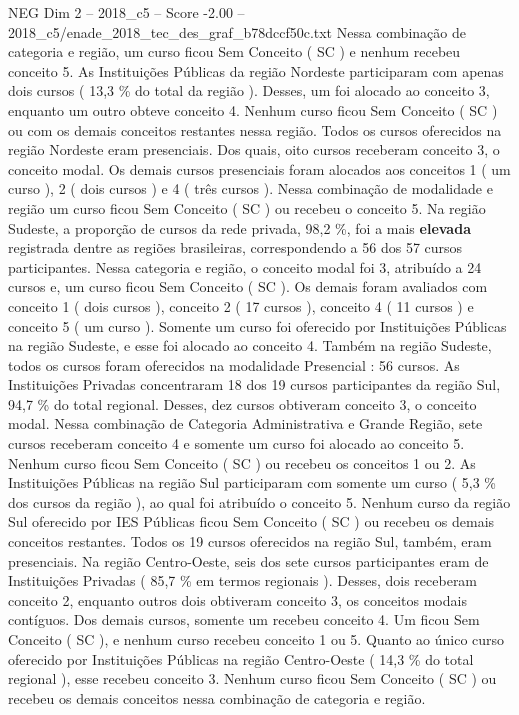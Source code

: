 \begin{textsample}{NEG Dim 2 – 2018\_c5 – Score -2.00 – 2018\_c5/enade\_2018\_tec\_des\_graf\_b78dccf50c.txt}
Nessa combinação de categoria e região, um curso ficou Sem Conceito ( SC ) e nenhum recebeu conceito 5.
As Instituições Públicas da região Nordeste participaram com apenas dois cursos ( 13,3 \% do total da região ).
Desses, um foi alocado ao conceito 3, enquanto um outro obteve conceito 4.
Nenhum curso ficou Sem Conceito ( SC ) ou com os demais conceitos restantes nessa região.
Todos os cursos oferecidos na região Nordeste eram presenciais.
Dos quais, oito cursos receberam conceito 3, o conceito modal.
Os demais cursos presenciais foram alocados aos conceitos 1 ( um curso ), 2 ( dois cursos ) e 4 ( três cursos ).
Nessa combinação de modalidade e região um curso ficou Sem Conceito ( SC ) ou recebeu o conceito 5.
Na região Sudeste, a proporção de cursos da rede privada, 98,2 \%, foi a mais \textbf{elevada} registrada dentre as regiões brasileiras, correspondendo a 56 dos 57 cursos participantes.
Nessa categoria e região, o conceito modal foi 3, atribuído a 24 cursos e, um curso ficou Sem Conceito ( SC ).
Os demais foram avaliados com conceito 1 ( dois cursos ), conceito 2 ( 17 cursos ), conceito 4 ( 11 cursos ) e conceito 5 ( um curso ).
Somente um curso foi oferecido por Instituições Públicas na região Sudeste, e esse foi alocado ao conceito 4.
Também na região Sudeste, todos os cursos foram oferecidos na modalidade Presencial : 56 cursos.
As Instituições Privadas concentraram 18 dos 19 cursos participantes da região Sul, 94,7 \% do total regional.
Desses, dez cursos obtiveram conceito 3, o conceito modal.
Nessa combinação de Categoria Administrativa e Grande Região, sete cursos receberam conceito 4 e somente um curso foi alocado ao conceito 5.
Nenhum curso ficou Sem Conceito ( SC ) ou recebeu os conceitos 1 ou 2.
As Instituições Públicas na região Sul participaram com somente um curso ( 5,3 \% dos cursos da região ), ao qual foi atribuído o conceito 5.
Nenhum curso da região Sul oferecido por IES Públicas ficou Sem Conceito ( SC ) ou recebeu os demais conceitos restantes.
Todos os 19 cursos oferecidos na região Sul, também, eram presenciais.
Na região Centro-Oeste, seis dos sete cursos participantes eram de Instituições Privadas ( 85,7 \% em termos regionais ).
Desses, dois receberam conceito 2, enquanto outros dois obtiveram conceito 3, os conceitos modais contíguos.
Dos demais cursos, somente um recebeu conceito 4.
Um ficou Sem Conceito ( SC ), e nenhum curso recebeu conceito 1 ou 5.
Quanto ao único curso oferecido por Instituições Públicas na região Centro-Oeste ( 14,3 \% do total regional ), esse recebeu conceito 3.
Nenhum curso ficou Sem Conceito ( SC ) ou recebeu os demais conceitos nessa combinação de categoria e região.

\end{textsample}
